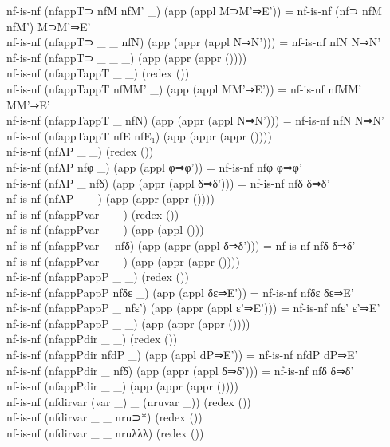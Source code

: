 {\begin{code}
{\>nf-is-nf (nfappT⊃ nfM nfM' \_) (app (appl M⊃M'⇒E')) = nf-is-nf (nf⊃ nfM nfM') M⊃M'⇒E'\<\\
\>nf-is-nf (nfappT⊃ \_ \_ nfN) (app (appr (appl N⇒N'))) = nf-is-nf nfN N⇒N'\<\\
\>nf-is-nf (nfappT⊃ \_ \_ \_) (app (appr (appr ())))\<\\
\>nf-is-nf (nfappTappT \_ \_) (redex ())\<\\
\>nf-is-nf (nfappTappT nfMM' \_) (app (appl MM'⇒E')) = nf-is-nf nfMM' MM'⇒E'\<\\
\>nf-is-nf (nfappTappT \_ nfN) (app (appr (appl N⇒N'))) = nf-is-nf nfN N⇒N'\<\\
\>nf-is-nf (nfappTappT nfE nfE₁) (app (appr (appr ())))\<\\
\>nf-is-nf (nfΛP \_ \_) (redex ())\<\\
\>nf-is-nf (nfΛP nfφ \_) (app (appl φ⇒φ')) = nf-is-nf nfφ φ⇒φ'\<\\
\>nf-is-nf (nfΛP \_ nfδ) (app (appr (appl δ⇒δ'))) = nf-is-nf nfδ δ⇒δ'\<\\
\>nf-is-nf (nfΛP \_ \_) (app (appr (appr ())))\<\\
\>nf-is-nf (nfappPvar \_ \_) (redex ())\<\\
\>nf-is-nf (nfappPvar \_ \_) (app (appl ()))\<\\
\>nf-is-nf (nfappPvar \_ nfδ) (app (appr (appl δ⇒δ'))) = nf-is-nf nfδ δ⇒δ'\<\\
\>nf-is-nf (nfappPvar \_ \_) (app (appr (appr ())))\<\\
\>nf-is-nf (nfappPappP \_ \_) (redex ())\<\\
\>nf-is-nf (nfappPappP nfδε \_) (app (appl δε⇒E')) = nf-is-nf nfδε δε⇒E'\<\\
\>nf-is-nf (nfappPappP \_ nfε') (app (appr (appl ε'⇒E'))) = nf-is-nf nfε' ε'⇒E'\<\\
\>nf-is-nf (nfappPappP \_ \_) (app (appr (appr ())))\<\\
\>nf-is-nf (nfappPdir \_ \_) (redex ())\<\\
\>nf-is-nf (nfappPdir nfdP \_) (app (appl dP⇒E')) = nf-is-nf nfdP dP⇒E'\<\\
\>nf-is-nf (nfappPdir \_ nfδ) (app (appr (appl δ⇒δ'))) = nf-is-nf nfδ δ⇒δ'\<\\
\>nf-is-nf (nfappPdir \_ \_) (app (appr (appr ())))\<\\
\>nf-is-nf (nfdirvar (var \_) \_ (nruvar \_)) (redex ())\<\\
\>nf-is-nf (nfdirvar \_ \_ nru⊃*) (redex ())\<\\
\>nf-is-nf (nfdirvar \_ \_ nruλλλ) (redex ())\<\\
}
\end{code}}
